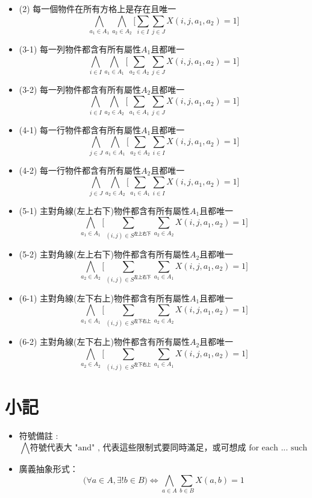 \documentclass{article}
\begin{document}
\begin{CJK}{UTF8}{bsmi}
\begin{itemize}
\item (2) 每一個物件在所有方格上是存在且唯一
	$$  \bigwedge_{a_1 \in A_1}\bigwedge_{a_2 \in A_2}  \bigg[\sum_{i\in I}\sum_{j \in J}X(i,j,a_1,a_2) =1  \bigg]$$
	
\item (3-1) 每一列物件都含有所有屬性$A_1$且都唯一
	$$  \bigwedge_{i\in I}\bigwedge_{a_1 \in A_1}  \bigg[\sum_{a_2 \in A_2}\sum_{j \in J}X(i,j,a_1,a_2) =1  \bigg]$$
\item (3-2) 每一列物件都含有所有屬性$A_2$且都唯一
	$$  \bigwedge_{i\in I}\bigwedge_{a_2 \in A_2}  \bigg[\sum_{a_1 \in A_1}\sum_{j \in J}X(i,j,a_1,a_2) =1  \bigg]$$


\item (4-1) 每一行物件都含有所有屬性$A_1$且都唯一
	$$  \bigwedge_{j\in J}\bigwedge_{a_1 \in A_1}  \bigg[\sum_{a_2 \in A_2}\sum_{i \in I}X(i,j,a_1,a_2) =1  \bigg]$$
	
\item (4-2) 每一行物件都含有所有屬性$A_2$且都唯一
$$  \bigwedge_{j\in J}\bigwedge_{a_2 \in A_2}  \bigg[\sum_{a_1 \in A_1}\sum_{i \in I}X(i,j,a_1,a_2) =1  \bigg]$$
	
\item (5-1) 主對角線(左上右下)物件都含有所有屬性$A_1$且都唯一
	$$  \bigwedge_{a_1 \in A_1}  \bigg[\sum_{(i,j)\in S^{\text{左上右下}}}\sum_{a_2 \in A_2}X(i,j,a_1,a_2) =1  \bigg]$$
\item (5-2) 主對角線(左上右下)物件都含有所有屬性$A_2$且都唯一
	$$  \bigwedge_{a_2 \in A_2} \bigg[\sum_{(i,j)\in S^{\text{左上右下}}}\sum_{a_1 \in A_1}X(i,j,a_1,a_2) =1  \bigg]$$
\item (6-1) 主對角線(左下右上)物件都含有所有屬性$A_1$且都唯一
	$$  \bigwedge_{a_1 \in A_1}  \bigg[\sum_{(i,j)\in S^{\text{左下右上}}}\sum_{a_2 \in A_2}X(i,j,a_1,a_2) =1  \bigg]$$
\item (6-2) 主對角線(左下右上)物件都含有所有屬性$A_2$且都唯一
	$$  \bigwedge_{a_2 \in A_2} \bigg[\sum_{(i,j)\in S^{\text{左下右上}}}\sum_{a_1 \in A_1}X(i,j,a_1,a_2) =1  \bigg]$$

\end{itemize}

\section{小記}
\begin{itemize}
\item  符號備註 : $$ \bigwedge \text{符號代表大 "and"  , 代表這些限制式要同時滿足，或可想成 for each ... such that   }$$
\item 廣義抽象形式：
		$$ \bigg(  \forall a \in A ,  \exists! b \in B \bigg)  \iff  \bigwedge_{a\in A} \sum_{b \in B} X(a,b) = 1 $$


\end{itemize}


\end{CJK}
\end{document}
